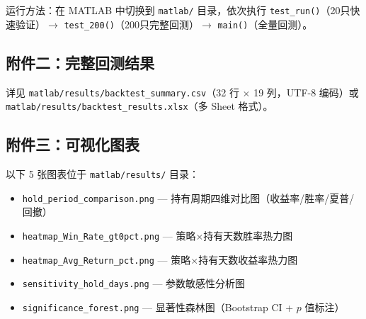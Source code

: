 \documentclass[12pt,a4paper]{ctexart}
\numberwithin{figure}{section}
\numberwithin{table}{section}
\begin{document}
运行方法：在 MATLAB 中切换到 \texttt{matlab/} 目录，依次执行 \texttt{test\_run()}（20只快速验证）$\to$ \texttt{test\_200()}（200只完整回测）$\to$ \texttt{main()}（全量回测）。

\subsection*{附件二：完整回测结果}
详见 \texttt{matlab/results/backtest\_summary.csv}（32 行 $\times$ 19 列，UTF-8 编码）或 \texttt{matlab/results/backtest\_results.xlsx}（多 Sheet 格式）。

\subsection*{附件三：可视化图表}
以下 5 张图表位于 \texttt{matlab/results/} 目录：
\begin{itemize}[leftmargin=*]
    \item \texttt{hold\_period\_comparison.png} — 持有周期四维对比图（收益率/胜率/夏普/回撤）
    \item \texttt{heatmap\_Win\_Rate\_gt0pct.png} — 策略$\times$持有天数胜率热力图
    \item \texttt{heatmap\_Avg\_Return\_pct.png} — 策略$\times$持有天数收益率热力图
    \item \texttt{sensitivity\_hold\_days.png} — 参数敏感性分析图
    \item \texttt{significance\_forest.png} — 显著性森林图（Bootstrap CI + $p$ 值标注）
\end{itemize}
\end{document}
